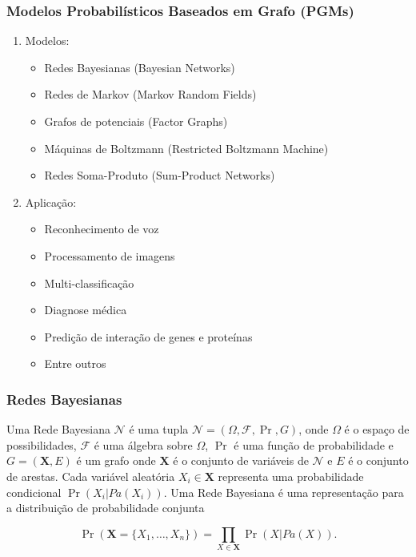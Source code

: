 \documentclass[10pt]{beamer}
\theoremstyle{plain}
\newcommand{\set}[1]{\mathbf{#1}}
\newcommand{\p}{\pause}
\begin{document}
\begin{frame}
  \frametitle{Modelos Probabilísticos Baseados em Grafo (PGMs)}

  \begin{enumerate}
    \item Modelos:
      \begin{itemize}
        \item Redes Bayesianas (Bayesian Networks)
        \item Redes de Markov (Markov Random Fields)
        \item Grafos de potenciais (Factor Graphs)
        \item Máquinas de Boltzmann (Restricted Boltzmann Machine)
        \item Redes Soma-Produto (Sum-Product Networks)\p
      \end{itemize}
    \item Aplicação:
      \begin{itemize}
        \item Reconhecimento de voz
        \item Processamento de imagens
        \item Multi-classificação
        \item Diagnose médica
        \item Predição de interação de genes e proteínas
        \item Entre outros
      \end{itemize}
  \end{enumerate}
\end{frame}

\begin{frame}
  \frametitle{Redes Bayesianas}
  \begin{definition}
    Uma Rede Bayesiana $\mathcal{N}$ é uma tupla $\mathcal{N}=(\Omega,\mathcal{F},\Pr,G)$, onde
    $\Omega$ é o espaço de possibilidades, $\mathcal{F}$ é uma álgebra sobre $\Omega$, $\Pr$ é uma
    função de probabilidade e $G=(\set{X},E)$ é um grafo onde $\set{X}$ é o conjunto de variáveis de
    $\mathcal{N}$ e $E$ é o conjunto de arestas. Cada variável aleatória $X_i\in\set{X}$ representa
    uma probabilidade condicional $\Pr(X_i|Pa(X_i))$. Uma Rede Bayesiana é uma representação para a
    distribuição de probabilidade conjunta

    \begin{equation}\label{factorization-thm}
      \Pr(\set{X}=\{X_1,\ldots,X_n\})=\prod_{X\in\set{X}} \Pr(X|Pa(X)).
    \end{equation}
  \end{definition}
\end{frame}
\end{document}
